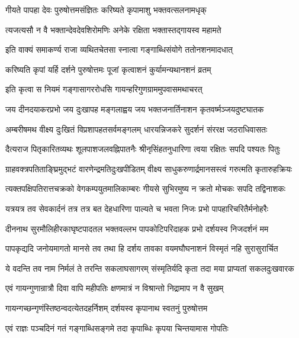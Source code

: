 \twolineshloka
{गीयते पापहा देवः पुरुषोत्तमसंज्ञितः}
{करिष्यते कृपामाशु भक्तवत्सलनामधृक्}%

\twolineshloka
{त्यजत्यसौ न वै भक्तान्देवदेवशिरोमणिः}
{अनेके रक्षिता भक्तास्तद्गायस्व महामते}%

\twolineshloka
{इति वाक्यं समाकर्ण्य राजा व्यथितचेतसा}
{स्नात्वा गङ्गाब्धिसंयोगे ततोनशनमादधात्}%

\twolineshloka
{करिष्यति कृपां यर्हि दर्शने पुरुषोत्तमः}
{पूजां कृत्वाशनं कुर्यामन्यथानशनं व्रतम्}%

\twolineshloka
{इति कृत्वा स नियमं गङ्गासागररोधसि}
{गायन्हरिगुणग्राममुपवासमथाचरत्}%


\twolineshloka
{जय दीनदयाकरप्रभो जय दुःखापह मङ्गलाह्वय}
{जय भक्तजनार्तिनाशन कृतवर्ष्मञ्जयदुष्टघातक}%

\twolineshloka
{अम्बरीषमथ वीक्ष्य दुःखितं विप्रशापहतसर्वमङ्गलम्}
{धारयन्निजकरे सुदर्शनं संररक्ष जठराधिवासतः}%

\twolineshloka
{दैत्यराज पितृकारितव्यथः शूलपाशजलवह्निपातनैः}
{श्रीनृसिंहतनुधारिणा त्वया रक्षितः सपदि पश्यतः पितुः}%

\twolineshloka
{ग्राहवक्त्रपतिताङ्घ्रिमुद्भटं वारणेन्द्रमतिदुःखपीडितम्}
{वीक्ष्य साधुकरुणार्द्रमानसस्त्वं गरुत्मति कृतारुहक्रियः}%

\twolineshloka
{त्यक्तपक्षिपतिरात्तचक्रको वेगकम्पयुतमालिकाम्बरः}
{गीयसे सुभिरमुष्य न क्रतो मोचकः सपदि तद्विनाशकः}%

\twolineshloka
{यत्रयत्र तव सेवकार्दनं तत्र तत्र बत देहधारिणा}
{पाल्यते च भवता निजः प्रभो पापहारिचरितैर्मनोहरैः}%

\twolineshloka
{दीननाथ सुरमौलिहीरकाघृष्टपादतल भक्तवल्लभ}
{पापकोटिपरिदाहक प्रभो दर्शयस्व निजदर्शनं मम}%

\twolineshloka
{पापकृद्यदि जनोयमागतो मानसे तव तथा हि दर्शय}
{तावका वयमघौघनाशनं विस्मृतं नहि सुरासुरार्चित}%

\twolineshloka
{ये वदन्ति तव नाम निर्मलं ते तरन्ति सकलाघसागरम्}
{संस्मृतिर्यदि कृता तदा मया प्राप्यतां सकलदुःखवारक}%


\twolineshloka
{एवं गायन्गुणान्रात्रौ दिवा वापि महीपतिः}
{क्षणमात्रं न विश्रान्तो निद्रामाप न वै सुखम्}%

\twolineshloka
{गायन्गच्छन्गृणंस्तिष्ठन्वदत्येतदहर्निशम्}
{दर्शयस्व कृपानाथ स्वतनुं पुरुषोत्तम}%

\twolineshloka
{एवं राज्ञः पञ्चदिनं गतं गङ्गाब्धिसङ्गमे}
{तदा कृपाब्धिः कृपया चिन्तयामास गोपतिः}%

